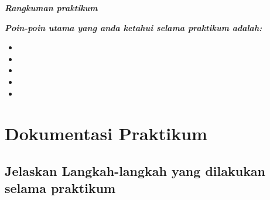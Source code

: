 \vspace*{-8.8mm}
{\centering\bfseries\fontsize{15}{18}\selectfont\judul\par}\vspace{1.4mm}
\begin{rangkuman}
  \linespread{1.0}\selectfont
  {\arialfont\bfseries\itshape\fontsize{12}{14}\selectfont Rangkuman praktikum}\par\vspace{4mm}
  {\arialfont\bfseries\itshape\fontsize{10}{12}\selectfont
  Poin-poin utama yang anda ketahui selama praktikum adalah:\par}\vspace{-1.5mm}
  \begin{itemize}[label=\raisebox{0.45ex}{\fontsize{3.2}{3.2}\selectfont$\blacksquare$},leftmargin=10.9mm,labelsep=3.85mm,labelwidth=0pt,
                  align=left,itemsep=0pt,topsep=0pt,parsep=0pt,
                  before=\normalfont\fontsize{9.6}{17.4}\selectfont]
    \item \titik
    \item \titik
    \item \titik
    \item \titik
    \item \titik
  \end{itemize}
\end{rangkuman}
\section{Dokumentasi Praktikum}

\subsection{Jelaskan Langkah-langkah yang dilakukan selama praktikum}

